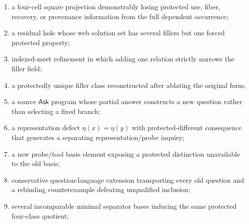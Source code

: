 \documentclass[11pt,oneside]{article}
\begin{document}
\begin{enumerate}
\item a four-cell square projection demonstrably losing protected use, fiber, recovery, or provenance information from the full dependent occurrence;
\item a residual hole whose web solution set has several fillers but one forced protected property;
\item indexed-meet refinement in which adding one relation strictly narrows the filler field;
\item a protectedly unique filler class reconstructed after ablating the original form;
\item a source \(\mathsf{Ask}\) program whose partial answer constructs a new question rather than selecting a fixed branch;
\item a representation defect \(\eta(x)=\eta(y)\) with protected-different consequence that generates a separating representation/probe inquiry;
\item a new probe/tool basis element exposing a protected distinction unavailable to the old basis;
\item conservative question-language extension transporting every old question and a
rebinding counterexample defeating unqualified inclusion;
\item several incomparable minimal separator bases inducing the same protected
four-class quotient;


\end{enumerate}
\end{document}
